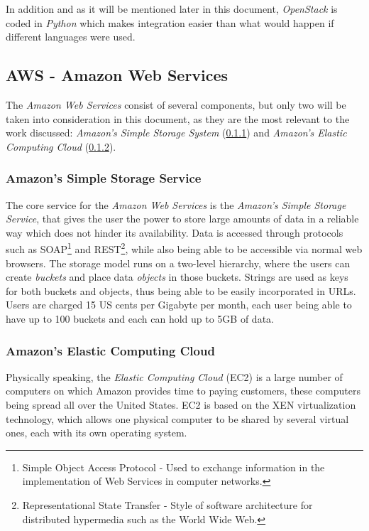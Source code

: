 In addition and as it will be mentioned later in this document, \textit{OpenStack} is coded in \textit{Python} which makes integration easier than what would happen if different languages were used.

\subsection{AWS - Amazon Web Services}\label{aws}

The \textit{Amazon Web Services} consist of several components, but only two will be taken into consideration in this document, as they are the most relevant to the work discussed: \textit{Amazon's Simple Storage System} (\ref{amazon-sss}) and \textit{Amazon's Elastic Computing Cloud} (\ref{amazon-ec}).

\subsubsection{Amazon's Simple Storage Service}\label{amazon-sss}

The core service for the \textit{Amazon Web Services} is the \textit{Amazon's Simple Storage Service}, that gives the user the power to store large amounts of data in a reliable way which does not hinder its availability. Data is accessed through protocols such as SOAP\footnote{Simple Object Access Protocol - Used to exchange information in the implementation of Web Services in computer networks.} and REST\footnote{Representational State Transfer - Style of software architecture for distributed hypermedia such as the World Wide Web.}, while also being able to be accessible via normal web browsers.
The storage model runs on a two-level hierarchy, where the users can create \textit{buckets} and place data \textit{objects} in those buckets. Strings are used as keys for both buckets and objects, thus being able to be easily incorporated in URLs. Users are charged 15 US cents per Gigabyte per month, each user being able to have up to 100 buckets and each can hold up to 5GB of data.\cite{hazel}

\subsubsection{Amazon's Elastic Computing Cloud}\label{amazon-ec}

Physically speaking, the \textit{Elastic Computing Cloud} (EC2) is a large number of computers on which Amazon provides time to paying customers, these computers being spread all over the United States. EC2 is based on the XEN virtualization technology, which allows one physical computer to be shared by several virtual ones, each with its own operating system.

